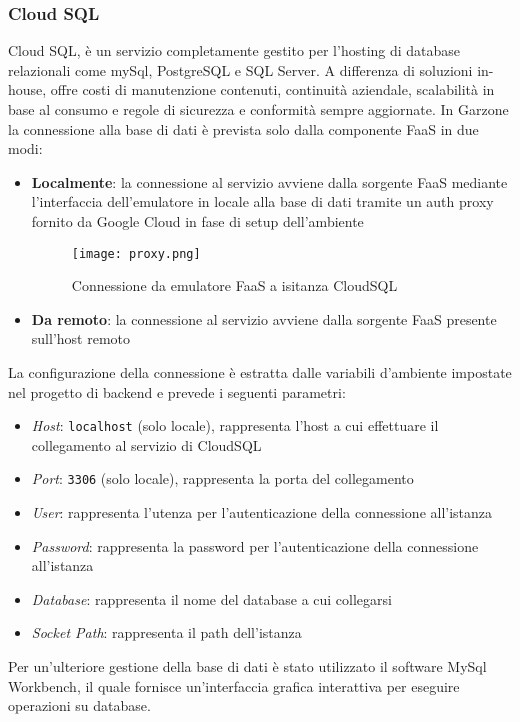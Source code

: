 \subsubsection{Cloud SQL}
Cloud SQL, è un servizio completamente gestito per l'hosting di database relazionali come mySql, PostgreSQL e SQL Server. A differenza di soluzioni in-house, offre costi di manutenzione contenuti, continuità aziendale, scalabilità in base al consumo e regole di sicurezza e conformità sempre aggiornate. In Garzone la connessione alla base di dati è prevista solo dalla componente FaaS in due modi:
\begin{itemize}
    \item \textbf{Localmente}: la connessione al servizio avviene dalla sorgente FaaS mediante l'interfaccia dell'emulatore in locale alla base di dati tramite un auth proxy fornito da Google Cloud in fase di setup dell'ambiente 
    \begin{figure}[!htb]
        \centering
        \texttt{[image: proxy.png]}
        \caption{Connessione da emulatore FaaS a isitanza CloudSQL}
    \end{figure}
    \item \textbf{Da remoto}: la connessione al servizio avviene dalla sorgente FaaS presente sull'host remoto
\end{itemize}
La configurazione della connessione è estratta dalle variabili d'ambiente impostate nel progetto di backend e prevede i seguenti parametri:
\begin{itemize}
    \item \textit{Host}: \lstinline[basicstyle=\ttfamily]!localhost! (solo locale), rappresenta l'host a cui effettuare il collegamento al servizio di CloudSQL
    \item \textit{Port}: \lstinline[basicstyle=\ttfamily]!3306! (solo locale), rappresenta la porta del collegamento
    \item \textit{User}: rappresenta l'utenza per l'autenticazione della connessione all'istanza
    \item \textit{Password}: rappresenta la password per l'autenticazione della connessione all'istanza
    \item \textit{Database}: rappresenta il nome del database a cui collegarsi
    \item \textit{Socket Path}: rappresenta il path dell'istanza  
\end{itemize} 
Per un'ulteriore gestione della base di dati è stato utilizzato il software MySql Workbench, il quale fornisce un'interfaccia grafica interattiva per eseguire operazioni su database. 
